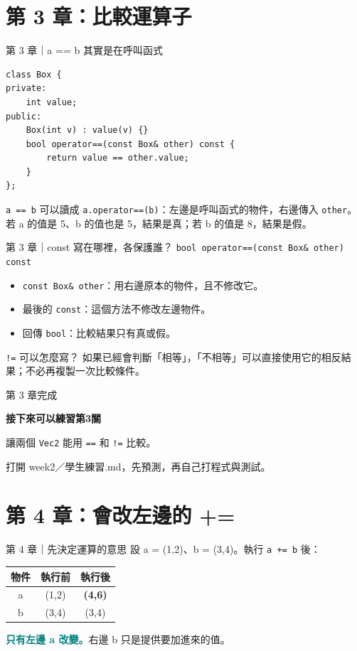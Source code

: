 \documentclass[aspectratio=169,11pt]{beamer}
\newcommand{\key}[1]{\textcolor{teal}{\textbf{#1}}}
\newcommand{\practice}[2]{%
  \begin{frame}[plain]
    \vspace*{1.5cm}
    {\large\color{muted} 第 #1 章完成}\par\vspace{0.45cm}
    {\Huge\bfseries\color{teal} 接下來可以練習第#1關}\par\vspace{0.7cm}
    {\Large #2}\par\vfill
    {\small\color{muted} 打開 week2／學生練習.md，先預測，再自己打程式與測試。}
  \end{frame}
}
\begin{document}
\section{第 3 章：比較運算子}
\begin{frame}[fragile]{第 3 章｜a == b 其實是在呼叫函式}
\begin{lstlisting}
class Box {
private:
    int value;
public:
    Box(int v) : value(v) {}
    bool operator==(const Box& other) const {
        return value == other.value;
    }
};
\end{lstlisting}
  \texttt{a == b} 可以讀成 \texttt{a.operator==(b)}：左邊是呼叫函式的物件，右邊傳入 \texttt{other}。
  \vspace{0.3em}
  若 a 的值是 5、b 的值也是 5，結果是真；若 b 的值是 8，結果是假。
\end{frame}

\begin{frame}{第 3 章｜const 寫在哪裡，各保護誰？}
  \Large
  \texttt{bool operator==(const Box\& other) const}
  \normalsize
  \vspace{0.8em}
  \begin{itemize}
    \item \texttt{const Box\& other}：用右邊原本的物件，且不修改它。
    \item 最後的 \texttt{const}：這個方法不修改左邊物件。
    \item 回傳 \texttt{bool}：比較結果只有真或假。
  \end{itemize}
  \begin{block}{\texttt{!=} 可以怎麼寫？}
    如果已經會判斷「相等」，「不相等」可以直接使用它的相反結果；不必再複製一次比較條件。
  \end{block}
\end{frame}
\practice{3}{讓兩個 \texttt{Vec2} 能用 \texttt{==} 和 \texttt{!=} 比較。}

\section{第 4 章：會改左邊的 +=}
\begin{frame}{第 4 章｜先決定運算的意思}
  設 a = (1,2)、b = (3,4)。執行 \texttt{a += b} 後：
  \begin{center}
  \begin{tabular}{c|c|c}
    物件 & 執行前 & 執行後 \\ \hline
    a & (1,2) & \textbf{(4,6)} \\
    b & (3,4) & (3,4)
  \end{tabular}
  \end{center}
  \key{只有左邊 a 改變。}右邊 b 只是提供要加進來的值。
\end{frame}
\end{document}
